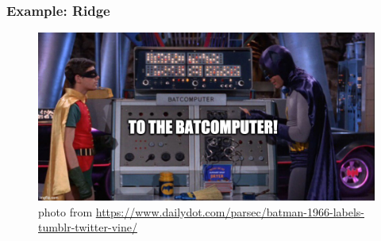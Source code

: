 \documentclass[
  shownotes,
  xcolor={svgnames},
  hyperref={colorlinks,citecolor=DarkBlue,linkcolor=andesred,urlcolor=DarkBlue}
  , aspectratio=169]{beamer}
\begin{document}
\begin{frame}[fragile]
\frametitle{Example: Ridge}
\begin{figure}[H] \centering
  \centering
  \includegraphics[scale=0.35]{figures/baticomputer_meme.jpg}
  \\
  \tiny photo from \url{https://www.dailydot.com/parsec/batman-1966-labels-tumblr-twitter-vine/}
\end{figure}

 \end{frame}


\end{document}
